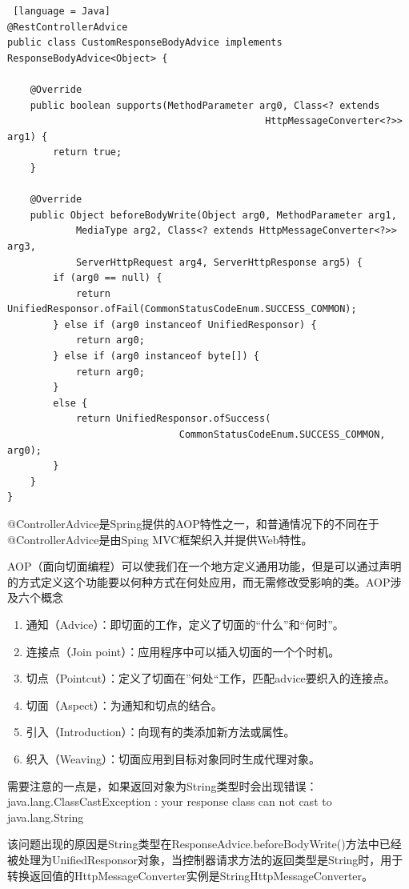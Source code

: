 \begin{lstlisting} [language = Java]
@RestControllerAdvice
public class CustomResponseBodyAdvice implements ResponseBodyAdvice<Object> {

    @Override
    public boolean supports(MethodParameter arg0, Class<? extends 
                                             HttpMessageConverter<?>> arg1) {
        return true;
    }

    @Override
    public Object beforeBodyWrite(Object arg0, MethodParameter arg1, 
            MediaType arg2, Class<? extends HttpMessageConverter<?>> arg3, 
            ServerHttpRequest arg4, ServerHttpResponse arg5) {
        if (arg0 == null) {
            return UnifiedResponsor.ofFail(CommonStatusCodeEnum.SUCCESS_COMMON);
        } else if (arg0 instanceof UnifiedResponsor) {
            return arg0;
        } else if (arg0 instanceof byte[]) {
            return arg0;
        }
        else {
            return UnifiedResponsor.ofSuccess(
                              CommonStatusCodeEnum.SUCCESS_COMMON, arg0);
        }
    }
}
\end{lstlisting}

@ControllerAdvice是Spring提供的AOP特性之一，和普通情况下的不同在于@ControllerAdvice是由Sping MVC框架织入并提供Web特性。

AOP（面向切面编程）可以使我们在一个地方定义通用功能，但是可以通过声明的方式定义这个功能要以何种方式在何处应用，而无需修改受影响的类\cite{.SpringInAction}。AOP涉及六个概念
\begin{enumerate}
  \item 通知（Advice）：即切面的工作，定义了切面的“什么”和“何时”。
  \item 连接点（Join point）：应用程序中可以插入切面的一个个时机。
  \item 切点（Pointcut）：定义了切面在”何处“工作，匹配advice要织入的连接点。
  \item 切面（Aspect）：为通知和切点的结合。
  \item 引入（Introduction）：向现有的类添加新方法或属性。
  \item 织入（Weaving）：切面应用到目标对象同时生成代理对象。
\end{enumerate}

需要注意的一点是，如果返回对象为String类型时会出现错误： \\java.lang.ClassCastException :  your response class can not cast to java.lang.String

该问题出现的原因是String类型在ResponseAdvice.beforeBodyWrite()方法中已经被处理为UnifiedResponsor对象，当控制器请求方法的返回类型是String时，用于转换返回值的HttpMessageConverter实例是StringHttpMessageConverter。


